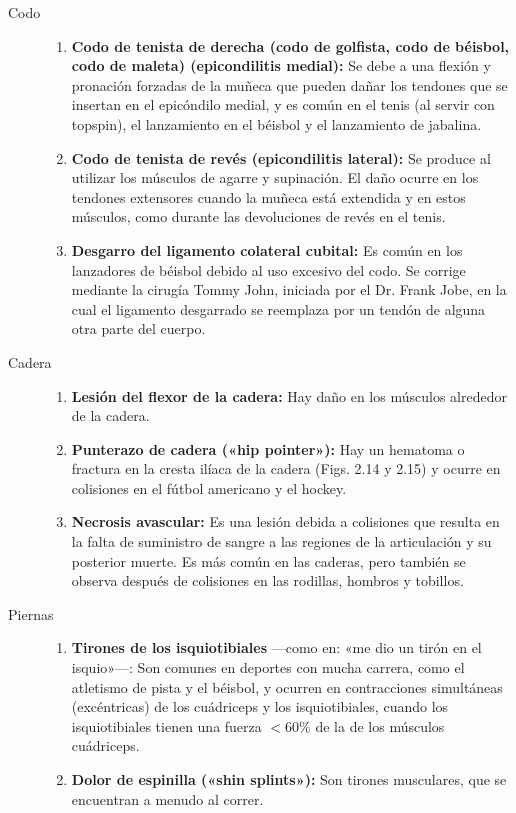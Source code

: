 \documentclass[12pt]{book}
\begin{document}
\begin{description}
  \item[Codo] \hfill
  \begin{enumerate}
    \item \textbf{Codo de tenista de derecha (codo de golfista, codo de béisbol, codo de maleta) (epicondilitis medial):} Se debe a una flexión y pronación forzadas de la muñeca que pueden dañar los tendones que se insertan en el epicóndilo medial, y es común en el tenis (al servir con topspin), el lanzamiento en el béisbol y el lanzamiento de jabalina.
    \item \textbf{Codo de tenista de revés (epicondilitis lateral):} Se produce al utilizar los músculos de agarre y supinación. El daño ocurre en los tendones extensores cuando la muñeca está extendida y en estos músculos, como durante las devoluciones de revés en el tenis.
    \item \textbf{Desgarro del ligamento colateral cubital:} Es común en los lanzadores de béisbol debido al uso excesivo del codo. Se corrige mediante la cirugía Tommy John, iniciada por el Dr. Frank Jobe, en la cual el ligamento desgarrado se reemplaza por un tendón de alguna otra parte del cuerpo.
  \end{enumerate}

  \item[Cadera] \hfill
  \begin{enumerate}
    \item \textbf{Lesión del flexor de la cadera:} Hay daño en los músculos alrededor de la cadera.
    \item \textbf{Punterazo de cadera («hip pointer»):} Hay un hematoma o fractura en la cresta ilíaca de la cadera (Figs. 2.14 y 2.15) y ocurre en colisiones en el fútbol americano y el hockey.
    \item \textbf{Necrosis avascular:} Es una lesión debida a colisiones que resulta en la falta de suministro de sangre a las regiones de la articulación y su posterior muerte. Es más común en las caderas, pero también se observa después de colisiones en las rodillas, hombros y tobillos.
  \end{enumerate}

  \item[Piernas] \hfill
  \begin{enumerate}
    \item \textbf{Tirones de los isquiotibiales} ---como en: «me dio un tirón en el isquio»---: Son comunes en deportes con mucha carrera, como el atletismo de pista y el béisbol, y ocurren en contracciones simultáneas (excéntricas) de los cuádriceps y los isquiotibiales, cuando los isquiotibiales tienen una fuerza $< 60\%$ de la de los músculos cuádriceps.
    \item \textbf{Dolor de espinilla («shin splints»):} Son tirones musculares, que se encuentran a menudo al correr.
  \end{enumerate}


\end{description}
\end{document}

